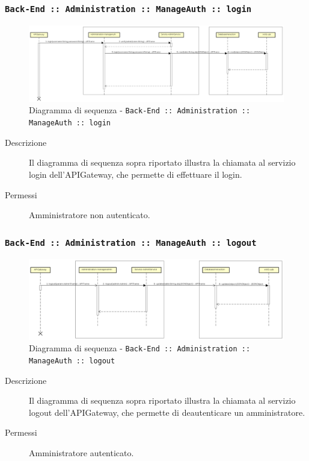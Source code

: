 \documentclass[../DefinizioneDiProdotto.tex]{subfiles}
\begin{document}
		\newpage
		\subsubsection{\texttt{Back-End :: Administration :: ManageAuth :: login}}
		\begin{figure}[!h]
			\centering
			\includegraphics[width=\textwidth]{DiagrammiSequenza/Back-End/manageAuth/login.png}
			\caption{Diagramma di sequenza - \texttt{Back-End :: Administration :: ManageAuth :: login }}
		\end{figure}
		\begin{description}
			\item [Descrizione] Il diagramma di sequenza sopra riportato illustra la chiamata al servizio login dell'APIGateway, che permette di effettuare il login.
			\item [Permessi] Amministratore non autenticato.
		\end{description}

		\subsubsection{\texttt{Back-End :: Administration :: ManageAuth :: logout}}
		\begin{figure}[!h]
			\centering
			\includegraphics[width=\textwidth]{DiagrammiSequenza/Back-End/manageAuth/logout.png}
			\caption{Diagramma di sequenza - \texttt{Back-End :: Administration :: ManageAuth :: logout }}
		\end{figure}
		\begin{description}
			\item [Descrizione] Il diagramma di sequenza sopra riportato illustra la chiamata al servizio logout dell'APIGateway, che permette di deautenticare un amministratore.
			\item [Permessi] Amministratore autenticato.
		\end{description}
\end{document}
